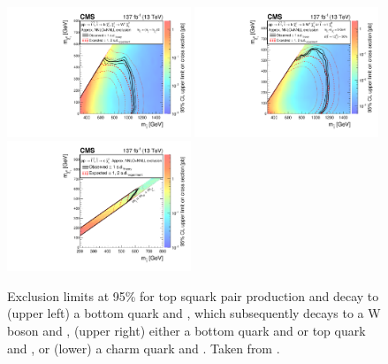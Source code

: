 \begin{figure}[htbp!]
 \centering
   \includegraphics[width=0.49\textwidth]{figures/MT2_2019/Figure_014-a}
   \includegraphics[width=0.49\textwidth]{figures/MT2_2019/Figure_014-b}
   \includegraphics[width=0.49\textwidth]{figures/MT2_2019/Figure_014-c}
   \caption[Exclusion limit at 95\% \CL for top squark pair production for various decay modes of the top squark.]{
     Exclusion limits at 95\% \CL for top squark pair production and decay to (upper left) a bottom quark and \chargino, which subsequently decays to a W boson and \lsp, (upper right) either a bottom quark and \chargino or top quark and \lsp, or (lower) a charm quark and \lsp. Taken from \cite{MT2_2019}.}
   \label{fig:stop_other}
\end{figure}

